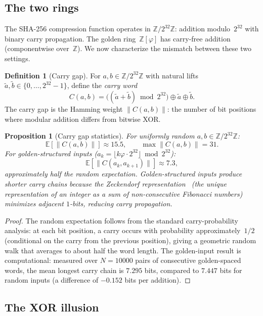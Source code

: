\documentclass[12pt, a4paper]{article}
\theoremstyle{plain}
\newtheorem{proposition}[theorem]{Proposition}
\theoremstyle{definition}
\newtheorem{definition}[theorem]{Definition}
\newcommand{\Z}{\mathbb{Z}}
\newcommand{\vp}{\varphi}
\newcommand{\Zphi}{\Z[\vp]}
\begin{document}
\subsection{The two rings}

The SHA-256 compression function operates in
$\Z/2^{32}\Z$: addition modulo~$2^{32}$ with binary carry
propagation.
The golden ring~$\Zphi$ has carry-free addition (componentwise
over~$\Z$).
We now characterize the mismatch between these two settings.

\begin{definition}[Carry gap]\label{def:carry-gap}
For $a,b\in\Z/2^{32}\Z$ with natural lifts $\tilde{a},\tilde{b}\in\{0,\ldots,2^{32}-1\}$,
define the \emph{carry word}
\[
  C(a,b) = \bigl((\tilde{a}+\tilde{b})\bmod 2^{32}\bigr)
           \oplus \tilde{a}\oplus\tilde{b}.
\]
The carry gap is the Hamming weight $\|C(a,b)\|$: the number of
bit positions where modular addition differs from bitwise XOR.
\end{definition}

\begin{proposition}[Carry gap statistics]\label{prop:carry-stats}
For uniformly random $a,b\in\Z/2^{32}\Z$:
\[
  \mathbb{E}[\|C(a,b)\|]\approx 15.5,\qquad
  \max\|C(a,b)\|= 31.
\]
For golden-structured inputs
($a_{k}=\lfloor k\vp\cdot 2^{32}\rfloor\bmod 2^{32}$):
\[
  \mathbb{E}[\|C(a_{k},a_{k+1})\|]\approx 7.3,
\]
approximately half the random expectation.
Golden-structured inputs produce shorter carry chains because the
Zeckendorf representation~\cite{zeckendorf} (the unique representation of an integer
as a sum of non-consecutive Fibonacci numbers) minimizes adjacent
$1$-bits, reducing carry propagation.
\end{proposition}

\begin{proof}
The random expectation follows from the standard carry-probability
analysis: at each bit position, a carry occurs with probability
approximately~$1/2$ (conditional on the carry from the previous
position), giving a geometric random walk that averages to about
half the word length.
The golden-input result is computational: measured over
$N=10000$ pairs of consecutive golden-spaced words, the mean
longest carry chain is $7.295$ bits, compared to $7.447$ bits
for random inputs (a difference of $-0.152$ bits per addition).
\end{proof}

\subsection{The XOR illusion}
\end{document}
